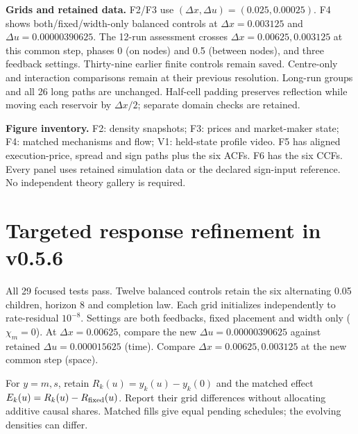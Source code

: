 \documentclass[11pt,a4paper]{article}
\newcommand{\du}{\Delta u}\newcommand{\dx}{\Delta x}
\begin{document}
\textbf{Grids and retained data.} F2/F3 use $(\dx,\du)=(0.025,0.00025)$.
F4 shows both/fixed/width-only balanced controls at $\dx=0.003125$ and
$\du=0.00000390625$.
The 12-run assessment crosses $\dx=0.00625,0.003125$ at this common step,
phases 0 (on nodes) and 0.5 (between nodes), and three feedback settings.
Thirty-nine earlier finite controls remain saved. Centre-only and interaction
comparisons remain at their previous resolution. Long-run groups and all
26 long paths are unchanged. Half-cell padding preserves reflection while
moving each reservoir by $\dx/2$; separate domain checks are retained.

\textbf{Figure inventory.} F2: density snapshots; F3: prices and market-maker
state; F4: matched mechanisms and flow; V1: held-state profile video.
F5 has aligned execution-price, spread and sign paths plus the six ACFs.
F6 has the six CCFs. Every panel uses retained simulation data or the
declared sign-input reference. No independent theory gallery is required.

\newpage
\section{Targeted response refinement in v0.5.6}
All 29 focused tests pass. Twelve balanced controls retain the six alternating
0.05 children, horizon 8 and completion law. Each grid initializes independently
to rate-residual $10^{-8}$. Settings are both feedbacks, fixed placement and
width only ($\chi_m=0$). At $\dx=0.00625$, compare the new
$\du=0.00000390625$ against retained $\du=0.000015625$ (time).
Compare $\dx=0.00625,0.003125$ at the new common step (space).

For $y=m,s$, retain $R_k(u)=y_k(u)-y_k(0)$ and the matched effect
$E_k(u)=R_k(u)-R_{\rm fixed}(u)$. Report their grid differences without
allocating additive causal shares. Matched fills give equal pending schedules;
the evolving densities can differ.
\end{document}
